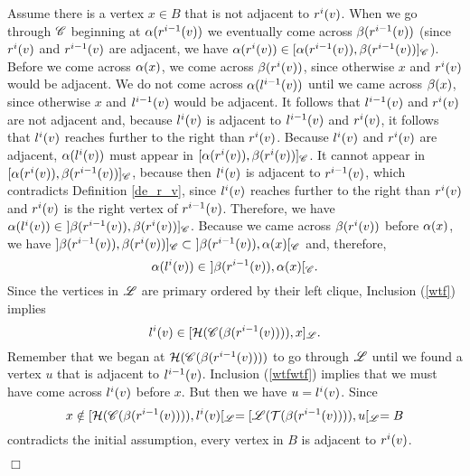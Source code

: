 \documentclass[10pt]{article}
\newenvironment{proof}{\noindent{\bf Proof~}}{\null\hfill $\Box$\par\medskip}
\newcommand{\ssref}[1]{(\ref{#1})}
\begin{document}
\begin{proof}
Assume there is a vertex $x\in B$ that is not adjacent to $\rvi{v}{i}$.
When we go through $\ri{C}$ beginning at $\lc{\rvi{v}{i-1}}$ we eventually come across $\rc{\rvi{v}{i-1}}$ 
(since $\rvi{v}{i}$ and $\rvi{v}{i-1}$ are adjacent, we have $\lc{\rvi{v}{i}}\in[\lc{\rvi{v}{i-1}},\rc{\rvi{v}{i-1}}]_\ri{C}$).
Before we come across $\lc{x}$, we come across $\rc{\rvi{v}{i}}$, since otherwise $x$ and $\rvi{v}{i}$ would be adjacent.
We do not come  across $\lc{\lvi{v}{i-1}}$ until we came across $\rc{x}$, since otherwise $x$ and $\lvi{v}{i-1}$ would be adjacent.
It follows that $\lvi{v}{i-1}$ and $\rvi{v}{i}$ are not adjacent and, because $\lvi{v}{i}$ is adjacent to  $\lvi{v}{i-1}$ and $\rvi{v}{i}$, it follows that $\lvi{v}{i}$ reaches further to the right than $\rvi{v}{i}$.
Because $\lvi{v}{i}$ and $\rvi{v}{i}$ are adjacent, $\lc{\lvi{v}{i}}$ 
must appear in $[\lc{\rvi{v}{i}},\rc{\rvi{v}{i}}]_\ri{C}$.
It cannot appear in $[\lc{\rvi{v}{i}},\rc{\rvi{v}{i-1}}]_\ri{C}$, because then $\lvi{v}{i}$ 
is adjacent to $\rvi{v}{i-1}$,
which contradicts Definition \ref{de_r_v}, since $\lvi{v}{i}$ reaches further to the right 
than $\rvi{v}{i}$ and $\rvi{v}{i}$ is the right vertex of $\rvi{v}{i-1}$.
Therefore, we have
$\lc{\lvi{v}{i}}\in~]\rc{\rvi{v}{i-1}},\rc{\rvi{v}{i}}]_\ri{C}$.
Because we came across $\rc{\rvi{v}{i}}$ before $\lc{x}$, we have $]\rc{\rvi{v}{i-1}},\rc{\rvi{v}{i}}]_\ri{C}\subset~]\rc{\rvi{v}{i-1}},\lc{x}[_\ri{C}$ and, therefore,
\begin{equation}\label{wtf}
\lc{\lvi{v}{i}}\in~]\rc{\rvi{v}{i-1}},\lc{x}[_\ri{C}.
\end{equation}
Since the vertices in $\ri{L}$ are primary ordered by their left clique, Inclusion (\ref{wtf}) implies
\begin{equation}\label{wtfwtf}
\lvi{v}{i}\in[\first{\ri{C}(\rc{\rvi{v}{i-1}})},x]_\ri{L}.
\end{equation}
Remember that we began at $\first{\ri{C}(\rc{\rvi{v}{i-1}})}$ 
to go through $\ri{L}$ until we found a vertex $u$ that is adjacent to $\lvi{v}{i-1}$.
Inclusion \ssref{wtfwtf} implies that we must  have come across $\lvi{v}{i}$ before $x$.
But then we have $u=\lvi{v}{i}$.
Since
$$x\notin[\first{\ri{C}(\rc{\rvi{v}{i-1}})},\lvi{v}{i}[_\ri{L}=[\ri{L}(\last{\rc{\rvi{v}{i-1}}}),u[_\ri{L}=B$$ 
contradicts the initial assumption, every vertex in $B$ is adjacent to $\rvi{v}{i}$.




\end{proof}
\end{document}
